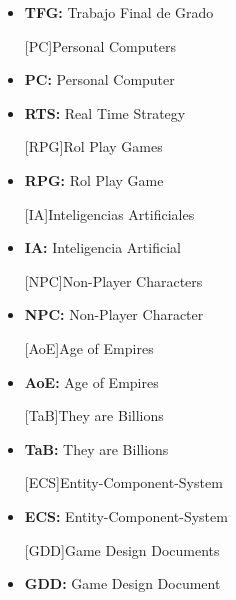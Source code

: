\begin{itemize}

[TFG]{Trabajos Finales de Grado}
\item \textbf{TFG:} Trabajo Final de Grado

[PC]{Personal Computers}
\item \textbf{PC:} Personal Computer

\item \textbf{RTS:} Real Time Strategy

[RPG]{Rol Play Games}
\item \textbf{RPG:} Rol Play Game

[IA]{Inteligencias Artificiales}
\item \textbf{IA:} Inteligencia Artificial

[NPC]{Non-Player Characters}
\item \textbf{NPC:} Non-Player Character

[AoE]{Age of Empires}
\item \textbf{AoE:} Age of Empires

[TaB]{They are Billions}
\item \textbf{TaB:} They are Billions

[ECS]{Entity-Component-System}
\item \textbf{ECS:} Entity-Component-System

[GDD]{Game Design Documents}
\item \textbf{GDD:} Game Design Document

\end{itemize}
